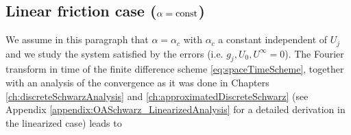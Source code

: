 \subsection{Linear friction case ($\alpha = {\rm const}$)}
%
%
We assume in this paragraph that $\alpha=\alpha_{c}$ with $\alpha_{c}$ 
a constant independent of $U_j$ and we study the system satisfied by the errors
(i.e. $g_j, U_0, U^\infty =0$). 
The Fourier transform in time of the finite difference scheme
\eqref{eq:spaceTimeScheme}, together with an analysis
of the convergence as it was done in
Chapters \ref{ch:discreteSchwarzAnalysis} and
\ref{ch:approximatedDiscreteSchwarz}
(see Appendix \ref{appendix:OASchwarz_LinearizedAnalysis}
for a detailed derivation in the linearized case) leads to 
